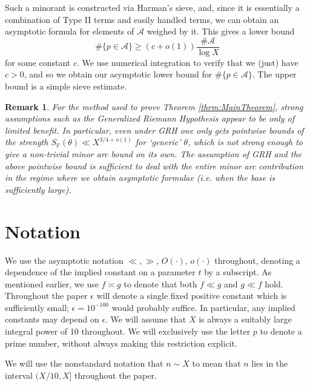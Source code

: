 \documentclass[10pt]{amsart}
\theoremstyle{plain}
\newtheorem*{rmk}{Remark}
\numberwithin{sblmm}{thrm}
\numberwithin{equation}{section}
\begin{document}
Such a minorant is constructed via Harman's sieve, and, since it is essentially a combination of Type II terms and easily handled terms, we can obtain an asymptotic formula for elements of $\mathcal{A}$ weighed by it. This gives a lower bound 
\[
\#\{p\in\mathcal{A}\}\ge(c+o(1))\frac{\#\mathcal{A}}{\log{X}}
\]
for some constant $c$. We use numerical integration to verify that we (just) have $c>0$, and so we obtain our asymptotic lower bound for $\#\{p\in\mathcal{A}\}$. The upper bound is a simple sieve estimate.
%
%
%
\begin{rmk}
For the method used to prove Theorem \ref{thrm:MainTheorem}, strong assumptions such as the Generalized Riemann Hypothesis appear to be only of limited benefit. In particular, even under GRH one only gets pointwise bounds of the strength $S_\mathbb{P}(\theta)\ll X^{3/4+o(1)}$ for `generic' $\theta$, which is not strong enough to give a non-trivial minor arc bound on its own. The assumption of GRH and the above pointwise bound is sufficient to deal with the entire minor arc contribution in the regime where we obtain asymptotic formulae (i.e. when the base is sufficiently large).
\end{rmk}
%
%
%
%
%
%
\section{Notation}
%
%
%
We use the asymptotic notation $\ll,\gg$, $O(\cdot)$, $o(\cdot)$ throughout, denoting a dependence of the implied constant on a parameter $t$ by a subscript. As mentioned earlier, we use $f \asymp g$ to denote that both $f\ll g$ and $g\ll f$ hold. Throughout the paper $\epsilon$ will denote a single fixed positive constant which is sufficiently small; $\epsilon=10^{-100}$ would probably suffice. In particular, any implied constants may depend on $\epsilon$. We will assume that $X$ is always a suitably large integral power of 10 throughout. We will exclusively use the letter $p$ to denote a prime number, without always making this restriction explicit.

We will use the nonstandard notation that $n\sim X$ to mean that $n$ lies in the interval $(X/10,X]$ throughout the paper. 
\end{document}
